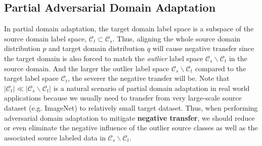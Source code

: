 \documentclass[runningheads]{llncs}
\begin{document}
\subsection{Partial Adversarial Domain Adaptation}
In partial domain adaptation, the target domain label space is a subspace of the source domain label space, $\mathcal{C}_t \subset \mathcal{C}_s$. Thus, aligning the whole source domain distribution $p$ and target domain distribution $q$ will cause negative transfer since the target domain is also forced to match the \emph{outlier} label space $\mathcal{C}_s \backslash \mathcal{C}_t$ in the source domain. And the larger the outlier label space $\mathcal{C}_s \backslash \mathcal{C}_t$ compared to the target label space $\mathcal{C}_t$, the severer the negative transfer will be. Note that $\left| {{\mathcal{C}_t}} \right| \ll \left| {{\mathcal{C}_s}\backslash {\mathcal{C}_t}} \right|$ is a natural scenario of partial domain adaptation in real world applications because we usually need to transfer from very large-scale source dataset (e.g. ImageNet) to relatively small target dataset. 
Thus, when performing adversarial domain adaptation to mitigate \textbf{negative transfer}, we should reduce or even eliminate the negative influence of the outlier source classes as well as the associated source labeled data in $\mathcal{C}_s \backslash \mathcal{C}_t$. 
\end{document}
